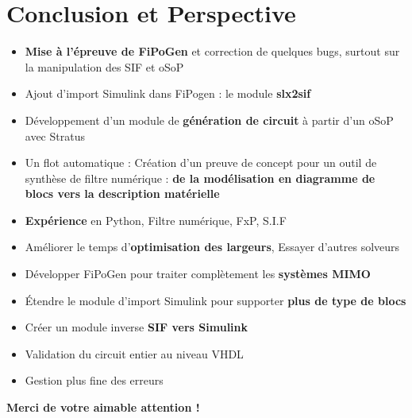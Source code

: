 \section{Conclusion et Perspective}

\begin{frame} 
\begin{itemize}
 
\item \textbf{Mise à l'épreuve de FiPoGen} et correction de quelques bugs, surtout sur la manipulation des SIF et oSoP
\item Ajout d'import Simulink dans FiPogen : le module \textbf{slx2sif}
\item Développement d'un module de \textbf{génération de circuit} à partir d'un oSoP avec Stratus
\item Un flot automatique : Création d'un preuve de concept pour un outil de synthèse de filtre numérique : \textbf{de la modélisation en diagramme de blocs vers la description matérielle}
\item \textbf{Expérience} en Python, Filtre numérique, FxP, S.I.F
\end{itemize}
\end{frame} 
\begin{frame} 
\begin{itemize}
\item Améliorer le temps d'\textbf{optimisation des largeurs}, Essayer d'autres solveurs
\item Développer FiPoGen pour traiter complètement les \textbf{systèmes MIMO}
\item Étendre le module d'import Simulink pour supporter \textbf{plus de type de blocs}
\item Créer un module inverse \textbf{SIF vers Simulink}
\item Validation du circuit entier au niveau VHDL
\item Gestion plus fine des erreurs
\end{itemize}
\end{frame}

\begin{frame} 
	\begin{center}
	\huge \textbf{Merci de votre aimable attention !}
	\end{center}
\end{frame}



 
